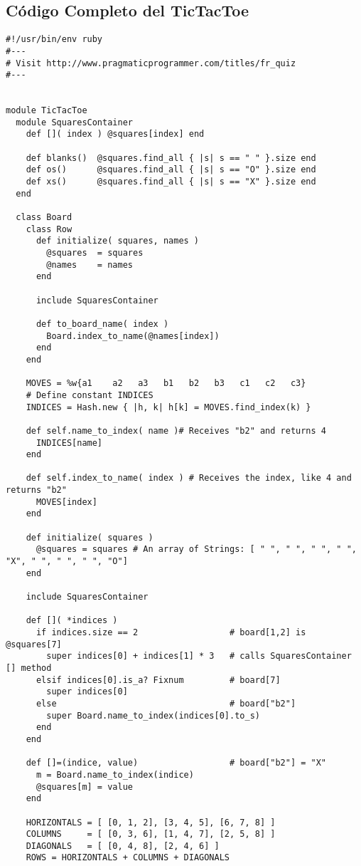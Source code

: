 \subsection{Código Completo del TicTacToe}
\begin{verbatim}
#!/usr/bin/env ruby
#---
# Visit http://www.pragmaticprogrammer.com/titles/fr_quiz 
#---


module TicTacToe
  module SquaresContainer
    def []( index ) @squares[index] end

    def blanks()  @squares.find_all { |s| s == " " }.size end
    def os()      @squares.find_all { |s| s == "O" }.size end
    def xs()      @squares.find_all { |s| s == "X" }.size end
  end
  
  class Board
    class Row
      def initialize( squares, names )
        @squares  = squares
        @names    = names
      end
      
      include SquaresContainer
      
      def to_board_name( index ) 
        Board.index_to_name(@names[index]) 
      end
    end
    
    MOVES = %w{a1    a2   a3   b1   b2   b3   c1   c2   c3}
    # Define constant INDICES
    INDICES = Hash.new { |h, k| h[k] = MOVES.find_index(k) }

    def self.name_to_index( name )# Receives "b2" and returns 4
      INDICES[name]
    end
    
    def self.index_to_name( index ) # Receives the index, like 4 and returns "b2"
      MOVES[index]
    end
    
    def initialize( squares )
      @squares = squares # An array of Strings: [ " ", " ", " ", " ", "X", " ", " ", " ", "O"]
    end
      
    include SquaresContainer
    
    def []( *indices )
      if indices.size == 2                  # board[1,2] is @squares[7]
        super indices[0] + indices[1] * 3   # calls SquaresContainer [] method
      elsif indices[0].is_a? Fixnum         # board[7]
        super indices[0]
      else                                  # board["b2"]
        super Board.name_to_index(indices[0].to_s)
      end
    end

    def []=(indice, value)                  # board["b2"] = "X"
      m = Board.name_to_index(indice)
      @squares[m] = value
    end
    
    HORIZONTALS = [ [0, 1, 2], [3, 4, 5], [6, 7, 8] ]
    COLUMNS     = [ [0, 3, 6], [1, 4, 7], [2, 5, 8] ]
    DIAGONALS   = [ [0, 4, 8], [2, 4, 6] ]
    ROWS = HORIZONTALS + COLUMNS + DIAGONALS


\end{verbatim}
